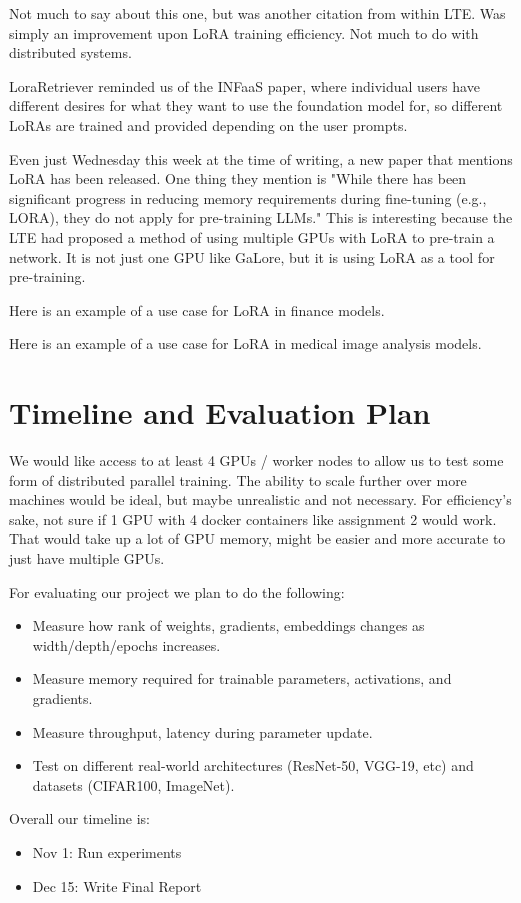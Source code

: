 \documentclass[pdftex,twocolumn,10pt,letterpaper]{article}
\begin{document}
\cite{lialin2023relora}
Not much to say about this one, but was another citation from within LTE. Was simply an improvement upon LoRA training efficiency. Not much to do with distributed systems.

\cite{zhao2024loraretriever}
LoraRetriever reminded us of the INFaaS paper, where individual users have different desires for what they want to use the foundation model for, so different LoRAs are trained and provided depending on the user prompts. 

\cite{zhao2024galore}
Even just Wednesday this week at the time of writing, a new paper that mentions LoRA has been released. One thing they mention is "While there has been significant progress in reducing memory requirements during fine-tuning (e.g., LORA), they do not apply for pre-training LLMs." This is interesting because the LTE had proposed a method of using multiple GPUs with LoRA to pre-train a network. It is not just one GPU like GaLore, but it is using LoRA as a tool for pre-training.

\cite{liu2024fingpt}
Here is an example of a use case for LoRA in finance models.

\cite{zhu2023melo}
Here is an example of a use case for LoRA in medical image analysis models.

\section{Timeline and Evaluation Plan}

We would like access to at least 4 GPUs / worker nodes to allow us to test some form of distributed parallel training. The ability to scale further over more machines would be ideal, but maybe unrealistic and not necessary. For efficiency's sake, not sure if 1 GPU with 4 docker containers like assignment 2 would work. That would take up a lot of GPU memory, might be easier and more accurate to just have multiple GPUs.

For evaluating our project we plan to do the following:
\begin{itemize}
  \item Measure how rank of weights, gradients, embeddings changes as width/depth/epochs increases.
  \item Measure memory required for trainable parameters, activations, and gradients.
  \item Measure throughput, latency during parameter update.
  \item Test on different real-world architectures (ResNet-50, VGG-19, etc) and datasets (CIFAR100, ImageNet).
\end{itemize}

Overall our timeline is:

\begin{itemize}
  \item Nov 1: Run experiments 
  \item Dec 15: Write Final Report
\end{itemize}

{


}
\end{document}
